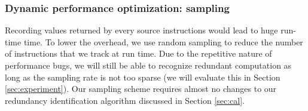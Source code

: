 
\subsubsection{Dynamic performance optimization: sampling}
\label{sec:inst}


Recording values returned by every source instructions would lead to 
huge run-time time. To lower the overhead,
we use random sampling to reduce the number of instructions that we
track at run time. Due to the repetitive nature of performance bugs,
we will still be able to recognize redundant 
computation as long as the sampling rate is not too sparse (we will evaluate
this in Section \ref{sec:experiment}). 
Our sampling scheme requires almost no changes to our redundancy 
identification algorithm discussed in Section \ref{sec:cal}.



